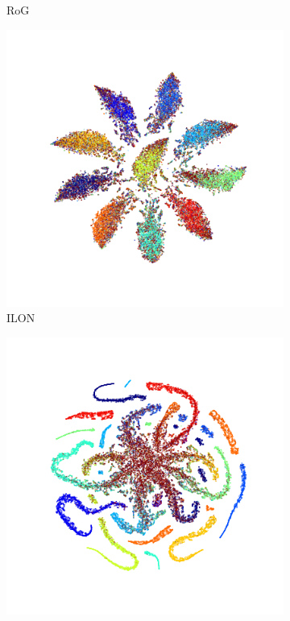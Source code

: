 \documentclass[11pt]{article}
\begin{document}
\begin{figure}[h]
\begin{subfigure}{.18\textwidth}
    \caption*{RoG~}
  \end{subfigure}
  \begin{subfigure}{.18\textwidth}
    \centering
    \includegraphics[width=\linewidth]{images/tsne/tsne_ILON_imagenet32.png}
    \caption*{ILON~}
  \end{subfigure}
  \begin{subfigure}{.18\textwidth}
    \centering
   \includegraphics[width=\linewidth]{images/tsne/tsne_ROG_cifar100.png}

\end{subfigure}
\end{figure}
\end{document}
